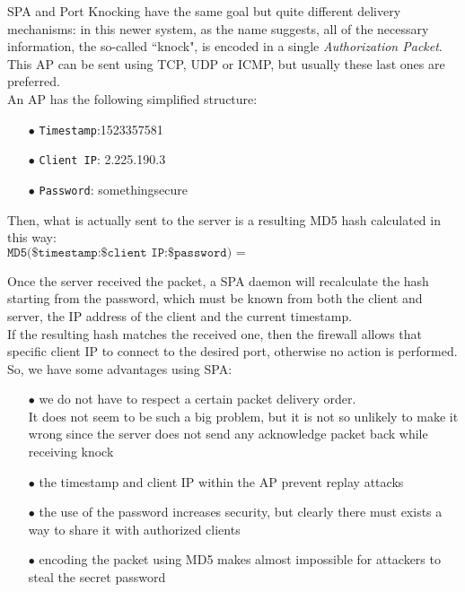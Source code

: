 \documentclass[12pt]{report}
\begin{document}
{{SPA and Port Knocking have the same goal but quite different delivery mechanisms: in this newer system, as the name suggests, all of the necessary information, the so-called ``knock", is encoded in a single \emph{Authorization Packet}.\\
This AP can be sent using TCP, UDP or ICMP, but usually these last ones are preferred.\\
An AP has the following simplified structure:

\begin{itemize}
\setlength{\itemindent}{+4mm}
\item[$\bullet$] \texttt{Timestamp}:1523357581
\item[$\bullet$] \texttt{Client IP}: 2.225.190.3
\item[$\bullet$] \texttt{Password}: somethingsecure
\end{itemize}

Then, what is actually sent to the server is a resulting MD5 hash calculated in this way:
\small
$$ \texttt{MD5(\$timestamp:\$client IP:\$password) = 35b45e73c99905b675ffb05b78714eb9} $$

\normalsize
Once the server received the packet, a SPA daemon will recalculate the hash starting from the password, which must be known from both the client and server, the IP address of the client and the current timestamp.\\
If the resulting hash matches the received one, then the firewall allows that specific client IP to connect to the desired port, otherwise no action is performed.\\
So, we have some advantages using SPA:

\begin{itemize}
\setlength{\itemindent}{+4mm}
\item[$\bullet$] we do not have to respect a certain packet delivery order.\\
It does not seem to be such a big problem, but it is not so unlikely to make it wrong since the server does not send any acknowledge packet back while receiving knock
\item[$\bullet$] the timestamp and client IP within the AP prevent replay attacks
\item[$\bullet$] the use of the password increases security, but clearly there must exists a way to share it with authorized clients
\item[$\bullet$] encoding the packet using MD5 makes almost impossible for attackers to steal the secret password
\end{itemize}

}}
\end{document}
